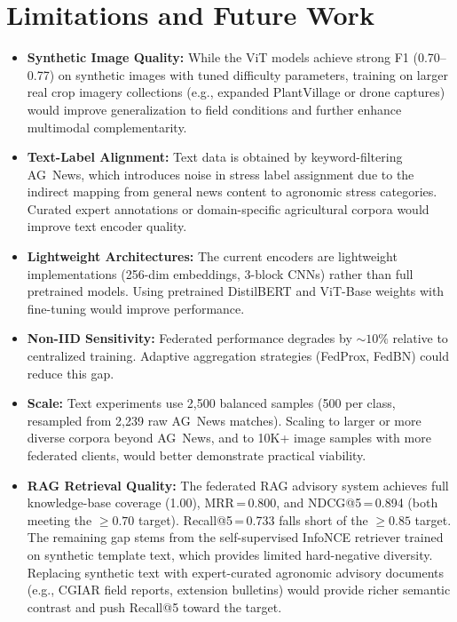 \documentclass[10pt,journal,compsoc]{IEEEtran}
\begin{document}
\section{Limitations and Future Work}
\label{sec:limitations}

\begin{itemize}[leftmargin=*]
    \item \textbf{Synthetic Image Quality:} While the ViT models achieve strong F1 (0.70--0.77) on synthetic images with tuned difficulty parameters, training on larger real crop imagery collections (e.g., expanded PlantVillage or drone captures) would improve generalization to field conditions and further enhance multimodal complementarity.

    \item \textbf{Text-Label Alignment:} Text data is obtained by keyword-filtering AG~News, which introduces noise in stress label assignment due to the indirect mapping from general news content to agronomic stress categories. Curated expert annotations or domain-specific agricultural corpora would improve text encoder quality.

    \item \textbf{Lightweight Architectures:} The current encoders are lightweight implementations (256-dim embeddings, 3-block CNNs) rather than full pretrained models. Using pretrained DistilBERT and ViT-Base weights with fine-tuning would improve performance.

    \item \textbf{Non-IID Sensitivity:} Federated performance degrades by ${\sim}10\%$ relative to centralized training. Adaptive aggregation strategies (FedProx, FedBN) could reduce this gap.

    \item \textbf{Scale:} Text experiments use 2,500 balanced samples (500 per class, resampled from 2,239 raw AG~News matches). Scaling to larger or more diverse corpora beyond AG~News, and to 10K+ image samples with more federated clients, would better demonstrate practical viability.

    \item \textbf{RAG Retrieval Quality:} The federated RAG advisory system achieves full knowledge-base coverage (1.00), MRR\,=\,0.800, and NDCG@5\,=\,0.894 (both meeting the ${\geq}0.70$ target). Recall@5\,=\,0.733 falls short of the ${\geq}0.85$ target. The remaining gap stems from the self-supervised InfoNCE retriever trained on synthetic template text, which provides limited hard-negative diversity. Replacing synthetic text with expert-curated agronomic advisory documents (e.g., CGIAR field reports, extension bulletins) would provide richer semantic contrast and push Recall@5 toward the target.
\end{itemize}
\end{document}
